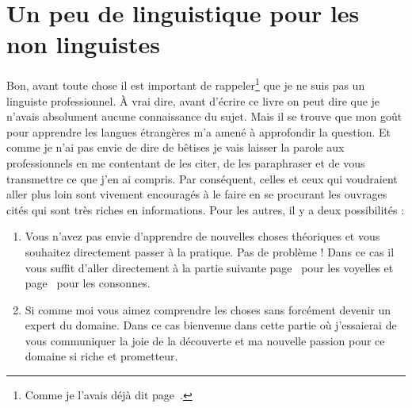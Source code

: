 \documentclass[12pt,a4paper, xetex, hyperref]{book}
\begin{document}
\part{Un peu de linguistique pour les non linguistes}

    \newpage
    \minitoc
    \newpage

    Bon, avant toute chose il est important de rappeler\footnote{Comme je
      l'avais déjà dit page~\pageref{sec:phonetics}.} que je ne suis pas
    un linguiste professionnel. À vrai dire, avant d'écrire ce livre on
    peut dire que je n'avais absolument aucune connaissance du sujet. Mais
    il se trouve que mon goût pour apprendre les langues étrangères m'a
    amené à approfondir la question. Et comme je n'ai pas envie de dire de
    bêtises je vais laisser la parole aux professionnels en me contentant
    de les citer, de les paraphraser et de vous transmettre ce que j'en ai
    compris. Par conséquent, celles et ceux qui voudraient aller plus loin
    sont vivement encouragés à le faire en se procurant les ouvrages cités
    qui sont très riches en informations. Pour les autres, il y a deux
    possibilités :
    
    \begin{enumerate}
    \item Vous n'avez pas envie d'apprendre de nouvelles choses théoriques
      et vous souhaitez directement passer à la pratique. Pas de problème
      ! Dans ce cas il vous suffit d'aller directement à la partie
      suivante page~\pageref{part:vow} pour les voyelles et
      page~\pageref{part:conson} pour les consonnes.
    \item Si comme moi vous aimez comprendre les choses sans forcément
      devenir un expert du domaine. Dans ce cas bienvenue dans cette
      partie où j'essaierai de vous communiquer la joie de la découverte
      et ma nouvelle passion pour ce domaine si riche et prometteur.  
    \end{enumerate}

    \begin{savequote}[80mm]
    \end{savequote}

    
\end{document}
